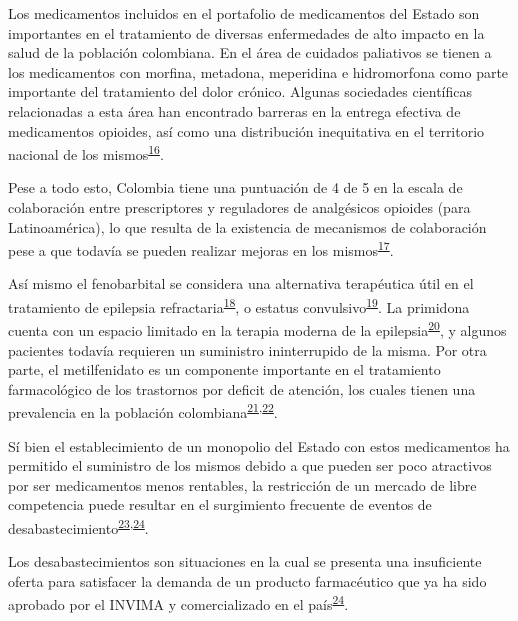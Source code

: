\documentclass[
]{book}
\begin{document}
Los medicamentos incluidos en el portafolio de medicamentos del Estado son importantes en el tratamiento de diversas enfermedades de alto impacto en la salud de la población colombiana. En el área de cuidados paliativos se tienen a los medicamentos con morfina, metadona, meperidina e hidromorfona como parte importante del tratamiento del dolor crónico. Algunas sociedades científicas relacionadas a esta área han encontrado barreras en la entrega efectiva de medicamentos opioides, así como una distribución inequitativa en el territorio nacional de los mismos\textsuperscript{\protect\hyperlink{ref-LeonDelgado2018}{16}}.

Pese a todo esto, Colombia tiene una puntuación de 4 de 5 en la escala de colaboración entre prescriptores y reguladores de analgésicos opioides (para Latinoamérica), lo que resulta de la existencia de mecanismos de colaboración pese a que todavía se pueden realizar mejoras en los mismos\textsuperscript{\protect\hyperlink{ref-Pastrana2020}{17}}.

Así mismo el fenobarbital se considera una alternativa terapéutica útil en el tratamiento de epilepsia refractaria\textsuperscript{\protect\hyperlink{ref-WatsonLewis2014}{18}}, o estatus convulsivo\textsuperscript{\protect\hyperlink{ref-VergaraAguilar2019}{19}}. La primidona cuenta con un espacio limitado en la terapia moderna de la epilepsia\textsuperscript{\protect\hyperlink{ref-Johannessen2020}{20}}, y algunos pacientes todavía requieren un suministro ininterrupido de la misma. Por otra parte, el metilfenidato es un componente importante en el tratamiento farmacológico de los trastornos por deficit de atención, los cuales tienen una prevalencia en la población colombiana\textsuperscript{\protect\hyperlink{ref-Pineda2001}{21},\protect\hyperlink{ref-Llanos-Lizcanoa2019}{22}}.

Sí bien el establecimiento de un monopolio del Estado con estos medicamentos ha permitido el suministro de los mismos debido a que pueden ser poco atractivos por ser medicamentos menos rentables, la restricción de un mercado de libre competencia puede resultar en el surgimiento frecuente de eventos de desabastecimiento\textsuperscript{\protect\hyperlink{ref-LopezLopez2021}{23},\protect\hyperlink{ref-INVIMA2018-Desabast}{24}}.

Los desabastecimientos son situaciones en la cual se presenta una insuficiente oferta para satisfacer la demanda de un producto farmacéutico que ya ha sido aprobado por el INVIMA y comercializado en el país\textsuperscript{\protect\hyperlink{ref-INVIMA2018-Desabast}{24}}.
\end{document}
